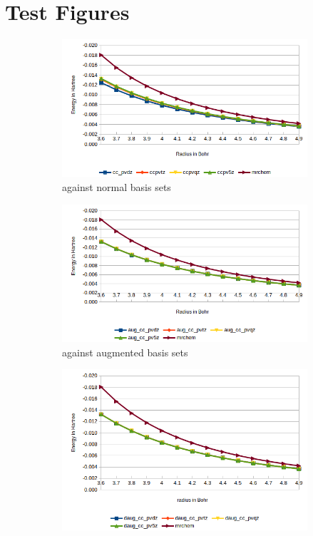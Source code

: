 \documentclass[../Thesis.tex]{subfiles}
\begin{document}
\chapter{Test Figures}\label{Figures}
\begin{figure}[hb!]
  \centering
  \begin{subfigure}[b]{0.75\linewidth}
    \includegraphics[width=\linewidth]{img/Erwat.png}
    \caption{\mrchem against normal basis sets}
  \end{subfigure}
  \begin{subfigure}[b]{0.75\linewidth}
    \includegraphics[width=\linewidth]{img/Eraugwat.png}
    \caption{\mrchem against augmented basis sets}
  \end{subfigure}
  \begin{subfigure}[b]{0.75\linewidth}
    \includegraphics[width=\linewidth]{img/Erdaugwat.png}

\end{subfigure}
\end{figure}
\end{document}
